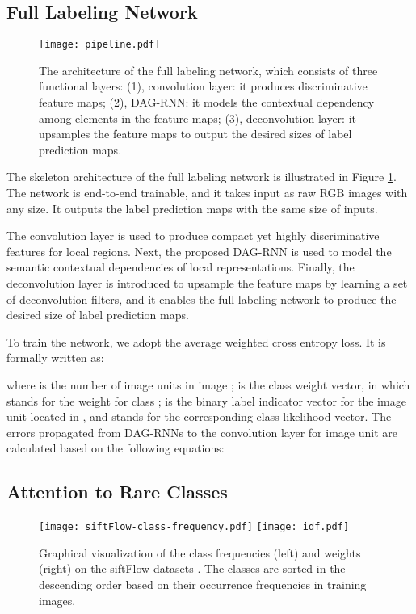 \documentclass[10pt,twocolumn,letterpaper]{article}
\begin{document}
\subsection{Full Labeling Network}
\begin{figure}[t]
\begin{center}
  \texttt{[image: pipeline.pdf]}
\end{center}
\caption{The architecture of the full labeling network, which consists of three functional layers: (1), convolution layer: it produces discriminative feature maps; (2), DAG-RNN: it models the contextual dependency among elements in the feature maps; (3), deconvolution layer: it upsamples the feature maps to output the desired sizes of label prediction maps.}
\label{Figure:pipeline}
\end{figure}

The skeleton architecture of the full labeling network is illustrated in Figure \ref{Figure:pipeline}. The network is end-to-end trainable, and it takes input as raw RGB images with any size. It outputs the label prediction maps with the same size of inputs.



The convolution layer is used to produce compact yet highly discriminative features for local regions.
Next, the proposed DAG-RNN is used to model the semantic contextual dependencies of local representations.
Finally, the deconvolution layer \cite{long2015fully} is introduced to upsample the feature maps by learning a set of deconvolution filters, and it enables the full labeling network to produce the desired size of label prediction maps.

To train the network, we adopt the average weighted cross entropy loss. It is formally written as:

where  is the number of image units in image ; { is the class weight vector}, in which  stands for the weight for class ;  is the binary label indicator vector for the image unit located in , and   stands for the corresponding class likelihood vector. The errors propagated from DAG-RNNs to the convolution layer for image unit  are calculated based on the following equations:



\subsection{Attention to Rare Classes}
\begin{figure}
\begin{center}
  \texttt{[image: siftFlow-class-frequency.pdf]}
  \hspace{-0.5em}
  \texttt{[image: idf.pdf]}
\end{center}
\caption{Graphical visualization of the class frequencies (left) and weights (right) on the siftFlow datasets \cite{liu2009nonparametric}. The classes are sorted in the descending order based on their occurrence frequencies in training images.}
  \label{Figure:idf}
\end{figure}
\end{document}
